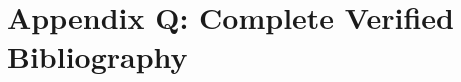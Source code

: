 \chapter*{Appendix Q: Complete Verified Bibliography}\label{app:bibliography}
\renewcommand{\bibname}{Verified References}


